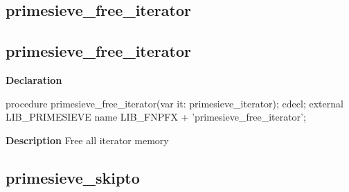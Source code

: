 \documentclass{report}
\newif\ifpdf
\begin{document}
\subsection*{\large{\textbf{primesieve{\_}free{\_}iterator}}\normalsize\hspace{1ex}\hrulefill}
\else
\subsection*{primesieve{\_}free{\_}iterator}
\fi
\label{primesieve-primesieve_free_iterator}
\begin{list}{}{
\setlength{\itemindent}{0cm}
\setlength{\listparindent}{0cm}
\setlength{\leftmargin}{\evensidemargin}
\addtolength{\leftmargin}{\tmplength}
\settowidth{\labelsep}{X}
\addtolength{\leftmargin}{\labelsep}
\setlength{\labelwidth}{\tmplength}
}
\item[\textbf{Declaration}\hfill]
\ifpdf
\begin{flushleft}
\fi
\begin{ttfamily}
procedure primesieve{\_}free{\_}iterator(var it: primesieve{\_}iterator); cdecl; external LIB{\_}PRIMESIEVE name LIB{\_}FNPFX + 'primesieve{\_}free{\_}iterator';\end{ttfamily}

\ifpdf
\end{flushleft}
\fi

\par
\item[\textbf{Description}]
Free all iterator memory

\end{list}
\ifpdf
\subsection*{\large{\textbf{primesieve{\_}skipto}}\normalsize\hspace{1ex}\hrulefill}
\else
\end{document}
